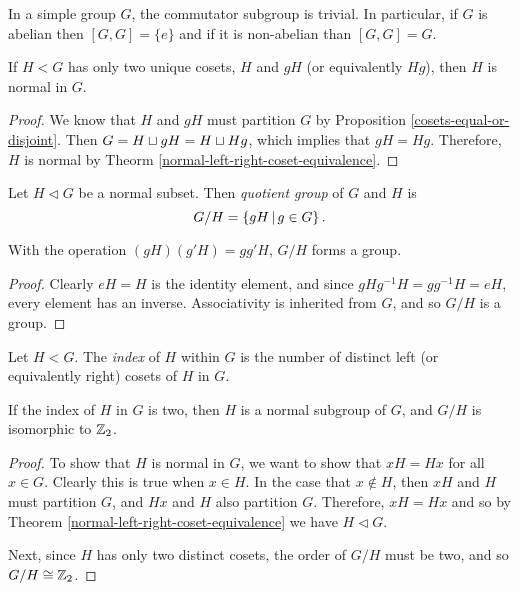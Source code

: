 \begin{cor}
    In a simple group $G$, the commutator subgroup is trivial. In particular, if $G$ is abelian then $[G, G] = \{e\}$ and if it is non-abelian than $[G, G] = G$.
\end{cor}

\begin{prop}
    If $H < G$ has only two unique cosets, $H$ and $gH$ (or equivalently $Hg$), then $H$ is normal in $G$.
\end{prop}

\begin{proof}
    We know that $H$ and $gH$ must partition $G$ by Proposition \ref{cosets-equal-or-disjoint}. Then $G = H \sqcup gH = H \sqcup Hg$, which implies that $gH = Hg$. Therefore, $H$ is normal by Theorm \ref{normal-left-right-coset-equivalence}.
\end{proof}

\begin{defn}
    Let $H \triangleleft G$ be a normal subset. Then \emph{quotient group} of $G$ and $H$ is
    \[G/H = \left\{gH \,\middle|\, g \in G\right\}.\]
\end{defn}

\begin{prop}
    With the operation $(gH)(g'H) = gg'H$, $G/H$ forms a group.
\end{prop}

\begin{proof}
    Clearly $eH = H$ is the identity element, and since
    $gHg^{-1}H = gg^{-1}H = eH$, every element has an inverse. Associativity is inherited from $G$, and so $G/H$ is a group.
\end{proof}

\begin{defn}
    Let $H < G$. The \emph{index} of $H$ within $G$ is the number of distinct left (or equivalently right) cosets of $H$ in $G$.
\end{defn}

\begin{prop}\label{index-two-normal}
    If the index of $H$ in $G$ is two, then $H$ is a normal subgroup of $G$, and $G/H$ is isomorphic to $\mathbb{Z}_2$.
\end{prop}

\begin{proof}
    To show that $H$ is normal in $G$, we want to show that $xH = Hx$ for all $x \in G$. Clearly this is true when $x \in H$. In the case that $x \not\in H$, then $xH$ and $H$ must partition $G$, and $Hx$ and $H$ also partition $G$. Therefore, $xH = Hx$ and so by Theorem \ref{normal-left-right-coset-equivalence} we have $H \triangleleft G$.

    Next, since $H$ has only two distinct cosets, the order of $G/H$ must be two, and so $G/H \cong \mathbb{Z}_2$.
\end{proof}

